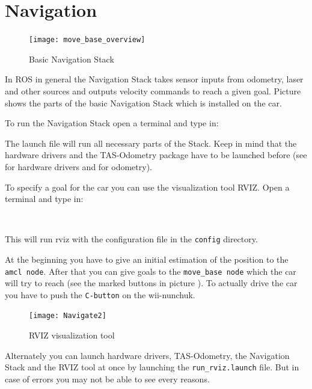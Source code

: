 \newpage
\section{Navigation}
\label{sec:tas_package_navigation}

\begin{figure}[h]
	\centering
		\texttt{[image: move\_base\_overview]}
	\caption{Basic Navigation Stack}
	\label{fig:move_base_overview}
\end{figure}

In ROS in general the Navigation Stack takes sensor inputs from odometry, laser and other sources and outputs velocity commands to reach a given goal. Picture  shows the parts of the basic Navigation Stack which is installed on the car.

To run the Navigation Stack open a terminal and type in:


The launch file will run all necessary parts of the Stack. Keep in mind that the hardware drivers and the TAS-Odometry package have to be launched before (see  for hardware drivers and  for odometry).

To specify a goal for the car you can use the visualization tool RVIZ. Open a terminal and type in:

 \\

This will run rviz with the configuration file in the \texttt{config} directory. 

At the beginning you have to give an initial estimation of the position to the \texttt{amcl node}. After that you can give goals to the \texttt{move\_base node} which the car will try to reach (see the marked buttons in picture ). To actually drive the car you have to push the \texttt{C-button} on the wii-nunchuk. 

\begin{figure}[h]
	\centering
		\texttt{[image: Navigate2]}
	\caption{RVIZ visualization tool}
	\label{fig:rviz_estimation}
\end{figure}


Alternately you can launch hardware drivers, TAS-Odometry, the Navigation Stack and the RVIZ tool at once by launching the \texttt{run\_rviz.launch} file. But in case of errors you may not be able to see every reasons.

